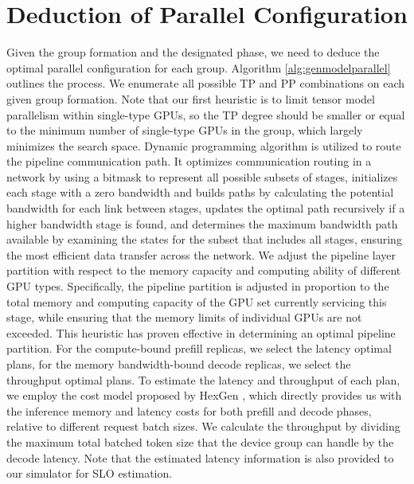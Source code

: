\section{Deduction of Parallel Configuration}
\label{appendix:b}
Given the group formation and the designated phase, we need to deduce the optimal parallel configuration for each group. Algorithm \autoref{alg:genmodelparallel} outlines the process.  We enumerate all possible TP and PP combinations on each given group formation. Note that our first heuristic is to limit tensor model parallelism within single-type GPUs, so the TP degree should be smaller or equal to the minimum number of single-type GPUs in the group, which largely minimizes the search space.  Dynamic programming algorithm is utilized to route the pipeline communication path. It optimizes communication routing in a network by using a bitmask to represent all possible subsets of stages, initializes each stage with a zero bandwidth and builds paths by calculating the potential bandwidth for each link between stages, updates the optimal path recursively if a higher bandwidth stage is found, and determines the maximum bandwidth path available by examining the states for the subset that includes all stages, ensuring the most efficient data transfer across the network.   We adjust the pipeline layer partition with respect to the memory capacity and computing ability of different GPU types. Specifically, the pipeline partition is adjusted in proportion to the total memory and computing capacity of the GPU set currently servicing this stage, while ensuring that the memory limits of individual GPUs are not exceeded. This heuristic has proven effective in determining an optimal pipeline partition.  For the compute-bound prefill replicas, we select the latency optimal plans, for the memory bandwidth-bound decode replicas, we select the throughput optimal plans. To estimate the latency and throughput of each plan, we employ the cost model proposed by HexGen \cite{jiang2024hexgen}, which directly provides us with the inference memory and latency costs for both prefill and decode phases, relative to different request batch sizes. We calculate the throughput by dividing the maximum total batched token size that the device group can handle by the decode latency. Note that the estimated latency information is also provided to our simulator for SLO estimation.


